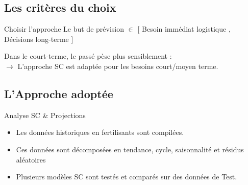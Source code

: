 \documentclass[handout]{beamer}
\begin{document}
\subsection{Les critères du choix}
	\begin{frame}
	
	\begin{block}{Choisir l'approche}
	Le but de prévision $ \in $ \footnotesize{ [ Besoin immédiat logistique , Décisions long-terme ] }
	 \\
	\begin{block}{}
	\small{Dans le court-terme, le passé pèse plus sensiblement : \\ $\rightarrow$  L'approche SC est adaptée pour les besoins court/moyen terme.}
		\end{block}
		\end{block}

	\end{frame}
	
\subsection{L'Approche adoptée}
	\begin{frame}
	
	\begin{block}{Analyse SC \& Projections}
	\begin{itemize}
	\item Les données historiques en fertilisants sont compilées.
	\item Ces données sont décomposées en tendance, cycle, saisonnalité et résidus aléatoires 
	\item Plusieurs modèles SC sont testés et comparés sur des données de Test.
	\end{itemize}
	\end{block}
	\end{frame}
\end{document}
